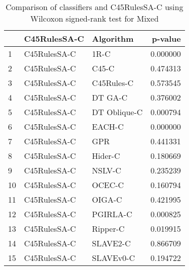 \begin{table}
\footnotesize
\caption{Comparison of classifiers and C45RulesSA-C using Wilcoxon signed-rank test for Mixed}
\label{tab:C45RulesSA-C wilcoxon Mixed comparison}
\begin{tabular}{lllr}
\hline
 & C45RulesSA-C & Algorithm & p-value \\
\hline
1 & C45RulesSA-C & 1R-C & 0.000000 \\
2 & C45RulesSA-C & C45-C & 0.474313 \\
3 & C45RulesSA-C & C45Rules-C & 0.573545 \\
4 & C45RulesSA-C & DT GA-C & 0.376002 \\
5 & C45RulesSA-C & DT Oblique-C & 0.000794 \\
6 & C45RulesSA-C & EACH-C & 0.000000 \\
7 & C45RulesSA-C & GPR & 0.441331 \\
8 & C45RulesSA-C & Hider-C & 0.180669 \\
9 & C45RulesSA-C & NSLV-C & 0.235239 \\
10 & C45RulesSA-C & OCEC-C & 0.160794 \\
11 & C45RulesSA-C & OIGA-C & 0.421995 \\
12 & C45RulesSA-C & PGIRLA-C & 0.000825 \\
13 & C45RulesSA-C & Ripper-C & 0.019915 \\
14 & C45RulesSA-C & SLAVE2-C & 0.866709 \\
15 & C45RulesSA-C & SLAVEv0-C & 0.194722 \\
\hline
\end{tabular}
\end{table}
